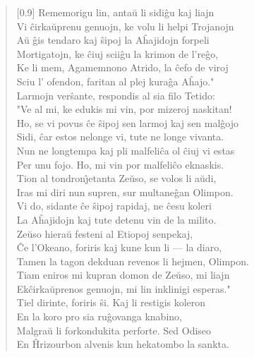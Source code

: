\begin{verse}[0.9\textwidth]
          Rememorigu lin, anta\u u li sidi\^gu kaj liajn\\
          Vi \^cirka\u uprenu genuojn, ke volu li helpi Trojanojn\\
          A\u u \^gis tendaro kaj \^sipoj la A\^hajidojn forpeli\\
          Mortigatojn, ke \^ciuj scii\^gu la krimon de l're\^go,\\
          Ke li mem, Agamemnono Atrido, la \^cefo de viroj\\
          Sciu l' ofendon, faritan al plej kura\^ga A\^hajo."\\
          \vin   Larmojn ver\^sante, respondis al sia filo Tetido:\\
          "Ve al mi, ke edukis mi vin, por mizeroj naskitan!\\
          Ho, se vi povus \^ce \^sipoj sen larmoj kaj sen mal\^gojo\\
          Sidi, \^car estos nelonge vi, tute ne longe vivanta.\\
          Nun ne longtempa kaj pli malfeli\^ca ol \^ciuj vi estas\\
          Per unu fojo. Ho, mi vin por malfeli\^co eknaskis.\\
          Tion al tondron\^{\j}etanta Ze\u uso, se volos li a\u udi,\\
          Iras mi diri nun supren, sur multane\^gan Olimpon.\\
          Vi do, sidante \^ce \^sipoj rapidaj, ne \^cesu koleri\\
          La A\^hajidojn kaj tute detenu vin de la milito.\\
          Ze\u uso hiera\u u festeni al Etiopoj senpekaj,\\
          \^Ce l'Okeano, foriris kaj kune kun li --- la diaro,\\
          Tamen la tagon dekduan revenos li hejmen, Olimpon.\\
          Tiam eniros mi kupran domon de Ze\u uso, mi liajn\\
          Ek\^cirka\u uprenos genuojn, mi lin inklinigi esperas."\\
          \vin   Tiel dirinte, foriris \^si. Kaj li restigis koleron\\
          En la koro pro sia ru\^govanga knabino,\\
          Malgra\u u li forkondukita perforte. Sed Odiseo\\
          En \^Hrizourbon alvenis kun hekatombo la sankta.\\

\end{verse}
